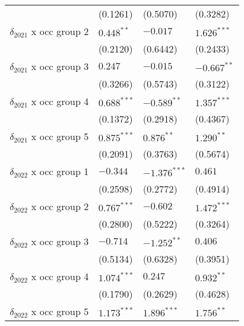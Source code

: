 \begin{tabular}{llll}
                                         &           (0.1261) &           (0.5070) &           (0.3282) \\
$\delta_{2021}$ x occ group 2            &       $0.448^{**}$ &           $-0.017$ &      $1.626^{***}$ \\
                                         &           (0.2120) &           (0.6442) &           (0.2433) \\
$\delta_{2021}$ x occ group 3            &            $0.247$ &           $-0.015$ &      $-0.667^{**}$ \\
                                         &           (0.3266) &           (0.5743) &           (0.3122) \\
$\delta_{2021}$ x occ group 4            &      $0.688^{***}$ &      $-0.589^{**}$ &      $1.357^{***}$ \\
                                         &           (0.1372) &           (0.2918) &           (0.4367) \\
$\delta_{2021}$ x occ group 5            &      $0.875^{***}$ &       $0.876^{**}$ &       $1.290^{**}$ \\
                                         &           (0.2091) &           (0.3763) &           (0.5674) \\
$\delta_{2022}$ x occ group 1            &           $-0.344$ &     $-1.376^{***}$ &            $0.461$ \\
                                         &           (0.2598) &           (0.2772) &           (0.4914) \\
$\delta_{2022}$ x occ group 2            &      $0.767^{***}$ &           $-0.602$ &      $1.472^{***}$ \\
                                         &           (0.2800) &           (0.5222) &           (0.3264) \\
$\delta_{2022}$ x occ group 3            &           $-0.714$ &      $-1.252^{**}$ &            $0.406$ \\
                                         &           (0.5134) &           (0.6328) &           (0.3951) \\
$\delta_{2022}$ x occ group 4            &      $1.074^{***}$ &            $0.247$ &       $0.932^{**}$ \\
                                         &           (0.1790) &           (0.2629) &           (0.4628) \\
$\delta_{2022}$ x occ group 5            &      $1.173^{***}$ &      $1.896^{***}$ &       $1.756^{**}$ \\

\end{tabular}
